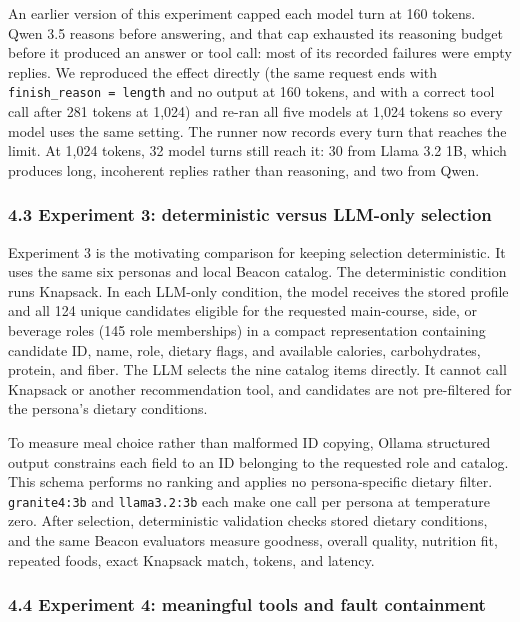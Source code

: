 \documentclass[
  10pt,
  letterpaper,
]{article}
\begin{document}
An earlier version of this experiment capped each model turn at 160
tokens. Qwen 3.5 reasons before answering, and that cap exhausted its
reasoning budget before it produced an answer or tool call: most of its
recorded failures were empty replies. We reproduced the effect directly
(the same request ends with \texttt{finish\_reason\ =\ length} and no
output at 160 tokens, and with a correct tool call after 281 tokens at
1,024) and re-ran all five models at 1,024 tokens so every model uses
the same setting. The runner now records every turn that reaches the
limit. At 1,024 tokens, 32 model turns still reach it: 30 from Llama 3.2
1B, which produces long, incoherent replies rather than reasoning, and
two from Qwen.

\subsubsection{4.3 Experiment 3: deterministic versus LLM-only
selection}\label{experiment-3-deterministic-versus-llm-only-selection}

Experiment 3 is the motivating comparison for keeping selection
deterministic. It uses the same six personas and local Beacon catalog.
The deterministic condition runs Knapsack. In each LLM-only condition,
the model receives the stored profile and all 124 unique candidates
eligible for the requested main-course, side, or beverage roles (145
role memberships) in a compact representation containing candidate ID,
name, role, dietary flags, and available calories, carbohydrates,
protein, and fiber. The LLM selects the nine catalog items directly. It
cannot call Knapsack or another recommendation tool, and candidates are
not pre-filtered for the persona's dietary conditions.

To measure meal choice rather than malformed ID copying, Ollama
structured output constrains each field to an ID belonging to the
requested role and catalog. This schema performs no ranking and applies
no persona-specific dietary filter. \texttt{granite4:3b} and
\texttt{llama3.2:3b} each make one call per persona at temperature zero.
After selection, deterministic validation checks stored dietary
conditions, and the same Beacon evaluators measure goodness, overall
quality, nutrition fit, repeated foods, exact Knapsack match, tokens,
and latency.

\subsubsection{4.4 Experiment 4: meaningful tools and fault
containment}\label{experiment-4-meaningful-tools-and-fault-containment}
\end{document}
